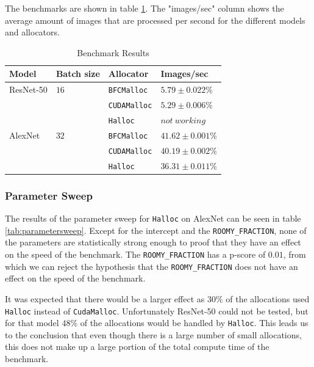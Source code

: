 \documentclass[12pt,twoside]{article}
\newcommand{\resnettimebfc}{$5.79\pm0.022\%$}     %
\newcommand{\resnettimecuda}{$5.29\pm0.006\%$}    %
\newcommand{\resnettimehalloc}{$not~working$}     %
\newcommand{\alexnettimebfc}{$41.62\pm0.001\%$}   %
\newcommand{\alexnettimecuda}{$40.19\pm0.002\%$}  %
\newcommand{\alexnettimehalloc}{$36.31\pm0.011\%$}%
\begin{document}
The benchmarks are shown in table \ref{tab:results}. The "images/sec" column shows the average amount of images that are processed per second for the different models and allocators.

\begin{table}[!ht]
\centering
\caption{Benchmark Results}
\label{tab:results}
\begin{tabular}{|l|l|l|l|}
\hline
\textbf{Model}     & \textbf{Batch size}  & \textbf{Allocator}          & \textbf{Images/sec}         \\ \hline
ResNet-50 & $16$        & \texttt{BFCMalloc} & \resnettimebfc     \\ \cline{3-4} 
          &             & \texttt{CUDAMalloc}  & \resnettimecuda    \\ \cline{3-4} 
          &             & \texttt{Halloc}    & \resnettimehalloc  \\ \hline
AlexNet   & $32$        & \texttt{BFCMalloc} & \alexnettimebfc    \\ \cline{3-4} 
          &             & \texttt{CUDAMalloc}  & \alexnettimecuda   \\ \cline{3-4} 
          &             & \texttt{Halloc}    & \alexnettimehalloc \\ \hline
\end{tabular}
\end{table}

\subsubsection*{Parameter Sweep}
The results of the parameter sweep for \texttt{Halloc} on AlexNet can be seen in table \ref{tab:parametersweep}. Except for the intercept and the \texttt{ROOMY\_FRACTION}, none of the parameters are statistically strong enough to proof that they have an effect on the speed of the benchmark. The \texttt{ROOMY\_FRACTION} has a p-score of $0.01$, from which we can reject the hypothesis that the \texttt{ROOMY\_FRACTION} does not have an effect on the speed of the benchmark.

It was expected that there would be a larger effect as $30\%$ of the allocations used \texttt{Halloc} instead of \texttt{CudaMalloc}. Unfortunately ResNet-50 could not be tested, but for that model $48\%$ of the allocations would be handled by \texttt{Halloc}. This leads us to the conclusion that even though there is a large number of small allocations, this does not make up a large portion of the total compute time of the benchmark.
\end{document}

